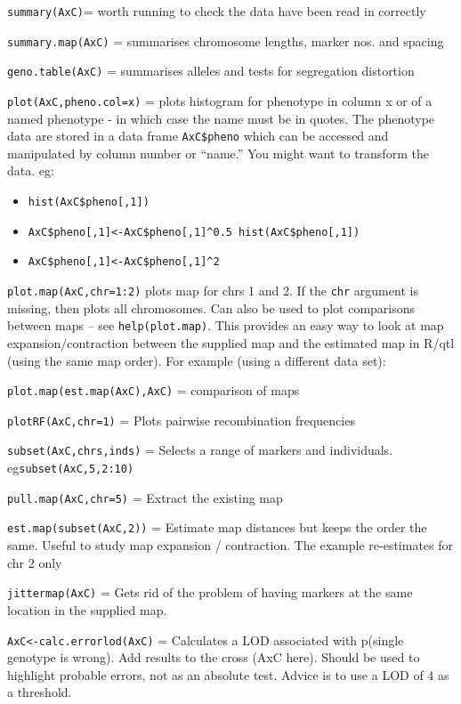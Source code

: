 \documentclass[
]{book}
\providecommand{\tightlist}{%
  \setlength{\itemsep}{0pt}\setlength{\parskip}{0pt}}
\begin{document}
\texttt{summary(AxC)}= worth running to check the data have been read in correctly

\texttt{summary.map(AxC)} = summarises chromosome lengths, marker nos. and spacing

\texttt{geno.table(AxC)} = summarises alleles and tests for segregation distortion

\texttt{plot(AxC,pheno.col=x)} = plots histogram for phenotype in column x or of a named phenotype - in which case the name must be in quotes. The phenotype data are stored in a data frame \texttt{AxC\$pheno} which can be accessed and manipulated by column number or ``name.'' You might want to transform the data. eg:

\begin{itemize}
\tightlist
\item
  \texttt{hist(AxC\$pheno{[},1{]})}
\item
  \texttt{AxC\$pheno{[},1{]}\textless{}-AxC\$pheno{[},1{]}\^{}0.5\ hist(AxC\$pheno{[},1{]})}
\item
  \texttt{AxC\$pheno{[},1{]}\textless{}-AxC\$pheno{[},1{]}\^{}2}
\end{itemize}

\texttt{plot.map(AxC,chr=1:2)} plots map for chrs 1 and 2. If the \texttt{chr} argument is missing,
then plots all chromosomes. Can also be used to plot comparisons between maps -- see \texttt{help(plot.map)}. This provides an easy way to look at map expansion/contraction between the supplied map and the estimated map in R/qtl (using the same map order). For example (using a different data set):

\texttt{plot.map(est.map(AxC),AxC)} = comparison of maps

\texttt{plotRF(AxC,chr=1)} = Plots pairwise recombination frequencies

\texttt{subset(AxC,chrs,inds)} = Selects a range of markers and individuals. eg\texttt{subset(AxC,5,2:10)}

\texttt{pull.map(AxC,chr=5)} = Extract the existing map

\texttt{est.map(subset(AxC,2))} = Estimate map distances but keeps the order the same. Useful to study map expansion / contraction. The example re-estimates for chr 2 only

\texttt{jittermap(AxC)} = Gets rid of the problem of having markers at the same location in the supplied map.

\texttt{AxC\textless{}-calc.errorlod(AxC)} = Calculates a LOD associated with p(single genotype is wrong). Add results to the cross (AxC here). Should be used to highlight probable errors, not as an absolute test. Advice is to use a LOD of 4 as a threshold.
\end{document}
